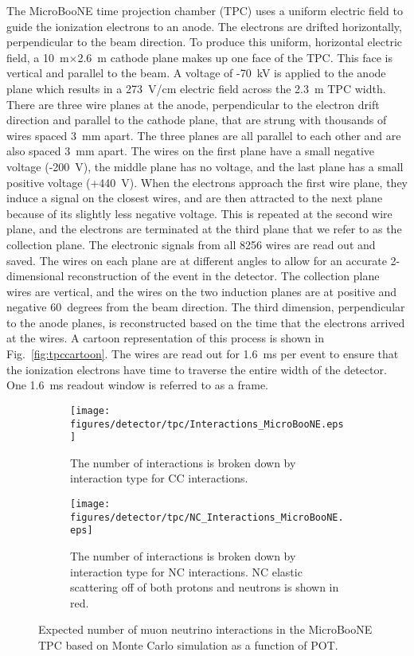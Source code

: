   The MicroBooNE time projection chamber (TPC) uses a uniform electric field to
  guide the ionization electrons to an anode. The electrons are drifted
  horizontally, perpendicular to the beam direction. To produce this uniform,
  horizontal electric field, a 10~m$\times$2.6~m cathode plane makes up one
  face of the TPC. This face is vertical and parallel to the beam. A voltage of
  -70~kV is applied to the anode plane which results in a 273~V/cm electric
  field across the 2.3~m TPC width.  There are three wire planes at the anode,
  perpendicular to the electron drift direction and parallel to the cathode
  plane, that are strung with thousands of wires spaced 3~mm apart.  The three
  planes are all parallel to each other and are also spaced 3~mm apart.  The
  wires on the first plane have a small negative voltage (-200~V), the middle
  plane has no voltage, and the last plane has a small positive voltage
  (+440~V). When the electrons approach the first wire plane, they induce a
  signal on the closest wires, and are then attracted to the next plane because
  of its slightly less negative voltage. This is repeated at the second wire
  plane, and the electrons are terminated at the third plane that we refer to
  as the collection plane. The electronic signals from all 8256 wires are read
  out and saved. The wires on each plane are at different angles to allow for
  an accurate 2-dimensional reconstruction of the event in the detector. The
  collection plane wires are vertical, and the wires on the two induction
  planes are at positive and negative 60~degrees from the beam direction. The
  third dimension, perpendicular to the anode planes, is reconstructed based on
  the time that the electrons arrived at the wires. A cartoon representation of
  this process is shown in Fig.~\ref{fig:tpccartoon}. The wires are read out
  for 1.6~ms per event to ensure that the ionization electrons have time to
  traverse the entire width of the detector. One 1.6~ms readout window is
  referred to as a frame.

  \begin{figure}[h]
    \centering
    \begin{subfigure}[t]{2.5in}
      \texttt{[image: figures/detector/tpc/Interactions\_MicroBooNE.eps]}
      \caption{The number of interactions is broken down by interaction type for CC interactions.}
      \label{fig:interactionsal}
    \end{subfigure}
    \hspace{2pt}
    \begin{subfigure}[t]{2.5in}
      \texttt{[image: figures/detector/tpc/NC\_Interactions\_MicroBooNE.eps]}
      \caption{The number of interactions is broken down by interaction type
      for NC interactions. NC elastic scattering off of both protons and
      neutrons is shown in red.}
      \label{fig:interactionsnc}
    \end{subfigure}
    \caption{Expected number of muon neutrino interactions in the
    MicroBooNE TPC based on Monte Carlo simulation as a function of POT.}
    \label{fig:interactions}
  \end{figure}

